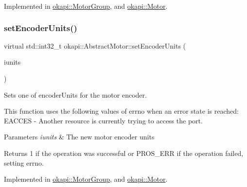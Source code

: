 Implemented in \mbox{\hyperlink{classokapi_1_1MotorGroup_a6d70691246bb8ba18d17f97b40a7f3f9}{okapi\+::\+Motor\+Group}}, and \mbox{\hyperlink{classokapi_1_1Motor_ab54e856d8d55c1f53e1be113a9e90a00}{okapi\+::\+Motor}}.

\mbox{\label{classokapi_1_1AbstractMotor_aae559b72399b0eb2124d969e40f97415}} 
\subsubsection{\texorpdfstring{setEncoderUnits()}{setEncoderUnits()}}
{\footnotesize\ttfamily virtual std\+::int32\+\_\+t okapi\+::\+Abstract\+Motor\+::set\+Encoder\+Units (\begin{DoxyParamCaption}\item[{\mbox{\hyperlink{classokapi_1_1AbstractMotor_ae811cd825099f2defadeb1b7f7e7764c}{encoder\+Units}}}]{iunits }\end{DoxyParamCaption})\hspace{0.3cm}{\ttfamily [pure virtual]}}

Sets one of encoder\+Units for the motor encoder.

This function uses the following values of errno when an error state is reached\+: E\+A\+C\+C\+ES -\/ Another resource is currently trying to access the port.


\begin{DoxyParams}{Parameters}
{\em iunits} & The new motor encoder units \\
\hline
\end{DoxyParams}
\begin{DoxyReturn}{Returns}
1 if the operation was successful or P\+R\+O\+S\+\_\+\+E\+RR if the operation failed, setting errno. 
\end{DoxyReturn}


Implemented in \mbox{\hyperlink{classokapi_1_1MotorGroup_ad08cc59d805811a81ce5d25580ad0ce0}{okapi\+::\+Motor\+Group}}, and \mbox{\hyperlink{classokapi_1_1Motor_a96466636470045aa63d81cb0effc9486}{okapi\+::\+Motor}}.

\mbox{\label{classokapi_1_1AbstractMotor_aba300f0e323cbdec60f1fee0f3197419}} 
